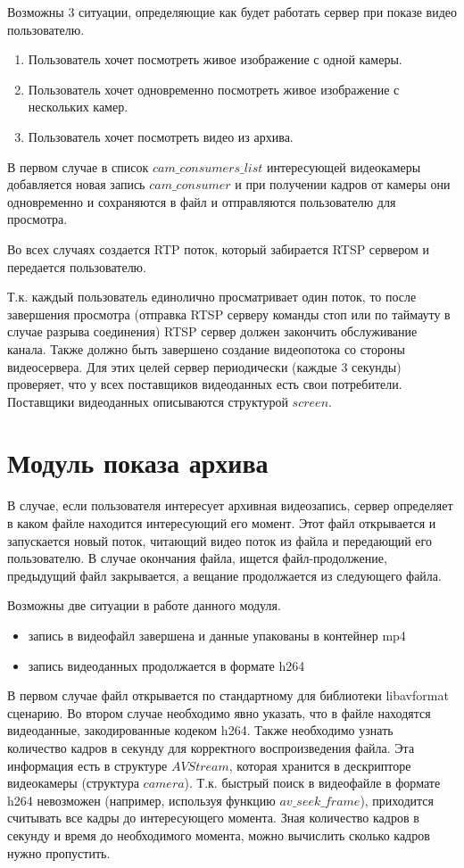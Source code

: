 Возможны 3 ситуации, определяющие как будет работать сервер при показе видео пользователю.
\begin{enumerate}
	\item Пользователь хочет посмотреть живое изображение с одной камеры.
	\item Пользователь хочет одновременно посмотреть живое изображение с нескольких камер.
	\item Пользователь хочет посмотреть видео из архива.
\end{enumerate}

В первом случае в список $cam\_consumers\_list$ интересующей видеокамеры добавляется новая запись
$cam\_consumer$ и при получении кадров от камеры они одновременно и сохраняются в файл и отправляются
пользователю для просмотра.

Во всех случаях создается RTP поток, который забирается RTSP сервером и передается пользователю.

Т.к. каждый пользователь единолично просматривает один поток, то после завершения просмотра
(отправка RTSP серверу команды стоп или по таймауту в случае разрыва соединения) RTSP сервер
должен закончить обслуживание канала.
Также должно быть завершено создание видеопотока со стороны видеосервера.
Для этих целей сервер периодически (каждые 3 секунды) проверяет, что у всех поставщиков
видеоданных есть свои потребители. Поставщики видеоданных описываются структурой $screen$.

\section{Модуль показа архива}
В случае, если пользователя интересует архивная видеозапись, сервер определяет в каком файле
находится интересующий его момент. Этот файл открывается и запускается новый поток, читающий видео
поток из файла и передающий его пользователю. В случае окончания файла, ищется файл-продолжение,
предыдущий файл закрывается, а вещание продолжается из следующего файла.

Возможны две ситуации в работе данного модуля.

\begin{itemize}
 \item запись в видеофайл завершена и данные упакованы в контейнер mp4
 \item запись видеоданных продолжается в формате h264
\end{itemize}

В первом случае файл открывается по стандартному для библиотеки libavformat сценарию.
Во втором случае необходимо явно указать, что в файле находятся видеоданные, закодированные
кодеком h264. Также необходимо узнать количество кадров в секунду для корректного
воспроизведения файла. Эта информация есть в структуре $AVStream$, которая хранится
в дескрипторе видеокамеры (структура $camera$). Т.к. быстрый поиск в видеофайле в формате h264
невозможен (например, используя функцию $av\_seek\_frame$), приходится считывать все кадры до
интересующего момента. Зная количество кадров в секунду и время до необходимого момента, можно
вычислить сколько кадров нужно пропустить.

